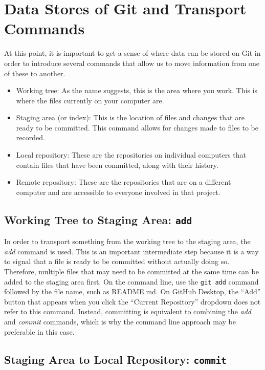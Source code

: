 \documentclass[10pt,twocolumn]{article}
\begin{document}
\section{Data Stores of Git and Transport Commands}

At this point, it is important to get a sense of where data can be stored on Git in order to introduce several commands that allow us to move information from one of these to another. \cite{DiveGit}


\begin{itemize}
    \item Working tree: As the name suggests, this is the area where you work. This is where the files currently on your computer are.
    \item Staging area (or index): This is the location of files and changes that are ready to be committed. This command allows for changes made to files to be recorded.
    \item Local repository: These are the repositories on individual computers that contain files that have been committed, along with their history.
    \item Remote repository: These are the repositories that are on a different computer and are accessible to everyone involved in that project. 
\end{itemize} 

\subsection{Working Tree to Staging Area: \texttt{add}}

In order to transport something from the working tree to the staging area, the \textit{add} command is used. This is an important intermediate step because it is a way to signal that a file is ready to be committed without actually doing so. Therefore, multiple files that may need to be committed at the same time can be added to the staging area first. On the command line, use the \texttt{git add} command followed by the file name, such as README.md. On GitHub Desktop, the “Add” button that appears when you click the “Current Repository” dropdown does not refer to this command. Instead, committing is equivalent to combining the \textit{add} and \textit{commit} commands, which is why the command line approach may be preferable in this case.

\subsection{Staging Area to Local Repository: \texttt{commit}}
\end{document}
